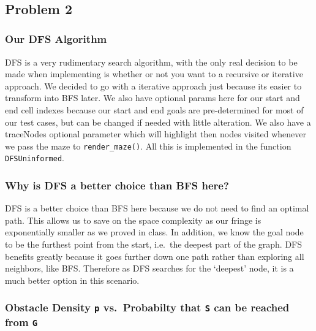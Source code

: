\documentclass[11pt]{article}
\begin{document}
    \begin{center}
    \end{center}
    { \hspace*{\fill} \\}
    
    \hypertarget{problem-2}{%
\subsection{Problem 2}\label{problem-2}}

\hypertarget{our-dfs-algorithm}{%
\subsubsection{Our DFS Algorithm}\label{our-dfs-algorithm}}

DFS is a very rudimentary search algorithm, with the only real decision
to be made when implementing is whether or not you want to a recursive
or iterative approach. We decided to go with a iterative approach just
because its easier to transform into BFS later. We also have optional
params here for our start and end cell indexes because our start and end
goals are pre-determined for most of our test cases, but can be changed
if needed with little alteration. We also have a traceNodes optional
parameter which will highlight then nodes visited whenever we pass the
maze to \texttt{render\_maze()}. All this is implemented in the function
\texttt{DFSUninformed}.

    \hypertarget{why-is-dfs-a-better-choice-than-bfs-here}{%
\subsubsection{Why is DFS a better choice than BFS
here?}\label{why-is-dfs-a-better-choice-than-bfs-here}}

DFS is a better choice than BFS here because we do not need to find an
optimal path. This allows us to save on the space complexity as our
fringe is exponentially smaller as we proved in class. In addition, we
know the goal node to be the furthest point from the start, i.e.~the
deepest part of the graph. DFS benefits greatly because it goes further
down one path rather than exploring all neighbors, like BFS. Therefore
as DFS searches for the `deepest' node, it is a much better option in
this scenario.

    \hypertarget{obstacle-density-p-vs.-probabilty-that-s-can-be-reached-from-g}{%
\subsubsection{\texorpdfstring{Obstacle Density \texttt{p}
vs.~Probabilty that \texttt{S} can be reached from
\texttt{G}}{Obstacle Density p vs.~Probabilty that S can be reached from G}}\label{obstacle-density-p-vs.-probabilty-that-s-can-be-reached-from-g}}
\end{document}
